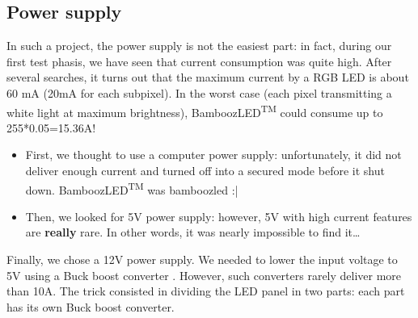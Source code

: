 \documentclass[a4paper,12pt]{article}
\begin{document}
\subsection{Power supply}
In such a project, the power supply is not the easiest part: in fact, during our first test phasis, we have seen that current consumption was quite high. After several searches, it turns out that the maximum current by a RGB LED is about 60 mA (20mA for each subpixel). In the worst case (each pixel transmitting a white light at maximum brightness), BamboozLED\textsuperscript{TM} could consume up to 255*0.05=15.36A!
\begin{itemize}
\item First, we thought to use a computer power supply: unfortunately, it did not deliver enough current and turned off into a secured mode before it shut down. BamboozLED\textsuperscript{TM} was bamboozled :|
\item Then, we looked for 5V power supply: however, 5V with high current features are \textbf{really} rare. In other words, it was nearly impossible to find it\ldots
\end{itemize}
Finally, we chose a 12V power supply. We needed to lower the input voltage to 5V using a Buck boost converter \cite{laomao,salar}. However, such converters rarely deliver more than 10A. The trick consisted in dividing the LED panel in two parts: each part has its own Buck boost converter.
\end{document}
